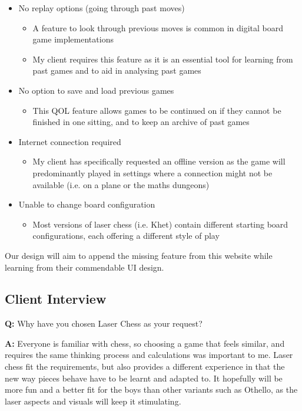 \documentclass[../main/main.tex]{subfiles}
\begin{document}
\begin{itemize}
\item No replay options (going through past moves)
    \begin{itemize}
    \item A feature to look through previous moves is common in digital board game implementations
    \item My client requires this feature as it is an essential tool for learning from past games and to aid in analysing past games
    \end{itemize}
\item No option to save and load previous games
    \begin{itemize}
    \item This QOL feature allows games to be continued on if they cannot be finished in one sitting, and to keep an archive of past games
    \end{itemize}
\item Internet connection required
    \begin{itemize}
    \item My client has specifically requested an offline version as the game will predominantly played in settings where a connection might not be available (i.e. on a plane or the maths dungeons)
    \end{itemize}
\item Unable to change board configuration
    \begin{itemize}
    \item Most versions of laser chess (i.e. Khet) contain different starting board configurations, each offering a different style of play
    \end{itemize}
\end{itemize}
Our design will aim to append the missing feature from this website while learning from their commendable UI design.

\subsection{Client Interview}

\textbf{Q:} Why have you chosen Laser Chess as your request?

\noindent\textbf{A:} Everyone is familiar with chess, so choosing a game that feels similar, and requires the same thinking process and calculations was important to me. Laser chess fit the requirements, but also provides a different experience in that the new way pieces behave have to be learnt and adapted to. It hopefully will be more fun and a better fit for the boys than other variants such as Othello, as the laser aspects and visuals will keep it stimulating.
\end{document}

